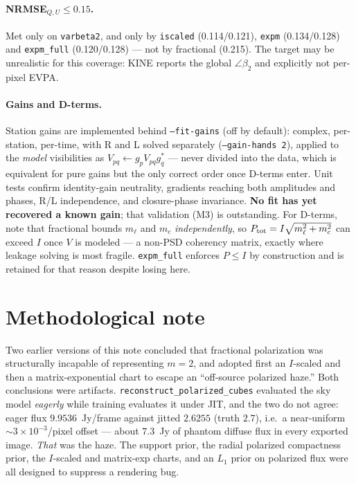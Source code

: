 \documentclass[11pt]{article}
\begin{document}
\paragraph{NRMSE$_{Q,U}\le0.15$.} Met only on \texttt{varbeta2}, and only by
\texttt{iscaled} (0.114/0.121), \texttt{expm} (0.134/0.128) and \texttt{expm\_full}
(0.120/0.128) --- not by fractional (0.215). The target may be unrealistic for this
coverage: KINE reports the global $\angle\beta_2$ and explicitly not per-pixel EVPA.

\paragraph{Gains and D-terms.} Station gains are implemented behind
\texttt{--fit-gains} (off by default): complex, per-station, per-time, with R and L
solved separately (\texttt{--gain-hands 2}), applied to the \emph{model} visibilities
as $V_{pq}\!\leftarrow\!g_p V_{pq} g_q^{*}$ --- never divided into the data, which is
equivalent for pure gains but the only correct order once D-terms enter. Unit tests
confirm identity-gain neutrality, gradients reaching both amplitudes and phases, R/L
independence, and closure-phase invariance. \textbf{No fit has yet recovered a known
gain}; that validation (M3) is outstanding. For D-terms, note that fractional bounds
$m_\ell$ and $m_c$ \emph{independently}, so $P_{\rm tot}=I\sqrt{m_\ell^2+m_c^2}$ can
exceed $I$ once $V$ is modeled --- a non-PSD coherency matrix, exactly where leakage
solving is most fragile. \texttt{expm\_full} enforces $P\le I$ by construction and is
retained for that reason despite losing here.

\section*{Methodological note}
\label{sec:bug}

Two earlier versions of this note concluded that fractional polarization was
structurally incapable of representing $m\!=\!2$, and adopted first an $I$-scaled and
then a matrix-exponential chart to escape an ``off-source polarized haze.'' Both
conclusions were artifacts. \texttt{reconstruct\_polarized\_cubes} evaluated the sky
model \emph{eagerly} while training evaluates it under JIT, and the two do not agree:
eager flux $9.9536$~Jy/frame against jitted $2.6255$ (truth $2.7$), i.e.\ a
near-uniform ${\sim}3\times10^{-3}$/pixel offset --- about $7.3$~Jy of phantom diffuse
flux in every exported image. \emph{That} was the haze. The support prior, the radial
polarized compactness prior, the $I$-scaled and matrix-exp charts, and an $L_1$ prior
on polarized flux were all designed to suppress a rendering bug.
\end{document}
